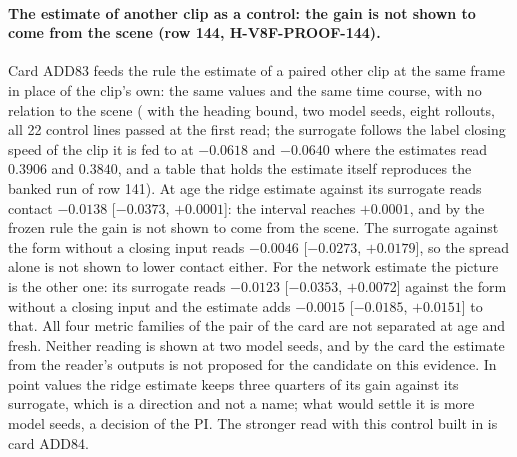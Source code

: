 \paragraph{The estimate of another clip as a control: the gain is not shown to come from the scene (row 144, H-V8F-PROOF-144).} Card ADD83 feeds the rule the estimate of a paired other clip at the same frame in place of the clip's own: the same values and the same time course, with no relation to the scene ( with the heading bound, two model seeds, eight rollouts, all 22 control lines passed at the first read; the surrogate follows the label closing speed of the clip it is fed to at $-0.0618$ and $-0.0640$ where the estimates read $0.3906$ and $0.3840$, and a table that holds the estimate itself reproduces the banked run of row 141). At age the ridge estimate against its surrogate reads contact $-0.0138$ [$-0.0373$, $+0.0001$]: the interval reaches $+0.0001$, and by the frozen rule the gain is not shown to come from the scene. The surrogate against the form without a closing input reads $-0.0046$ [$-0.0273$, $+0.0179$], so the spread alone is not shown to lower contact either. For the network estimate the picture is the other one: its surrogate reads $-0.0123$ [$-0.0353$, $+0.0072$] against the form without a closing input and the estimate adds $-0.0015$ [$-0.0185$, $+0.0151$] to that. All four metric families of the pair of the card are not separated at age and fresh. Neither reading is shown at two model seeds, and by the card the estimate from the reader's outputs is not proposed for the candidate on this evidence. In point values the ridge estimate keeps three quarters of its gain against its surrogate, which is a direction and not a name; what would settle it is more model seeds, a decision of the PI. The stronger read with this control built in is card ADD84.

